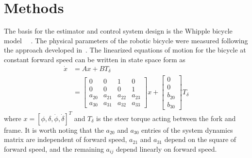 \documentclass[letterpaper,11pt]{article}
\begin{document}
\section{Methods} \label{sec:methods}
The basis for the estimator and control system design is the Whipple bicycle
model~\cite{Whipple1899}~\cite{Meijaard2007} . The physical parameters of the robotic bicycle were
measured following the approach developed in~\cite{Moore2010b}.  The linearized
equations of motion for the bicycle at constant forward speed can be written in state space form as
\begin{align}
  \dot{x} &= A x + B T_\delta \\
          &= \left[\begin{smallmatrix}0 & 0 & 1 & 0\\0 & 0 & 0 & 1\\a_{20} & a_{21} &
a_{22} & a_{23}\\a_{30} & a_{31} & a_{32} & a_{33}\end{smallmatrix}\right] x +
\left[\begin{smallmatrix}0\\0\\b_{20}\\b_{30}\end{smallmatrix}\right] T_\delta
\label{eq:linsys}
\end{align}
where $x = \left[\phi, \delta, \dot{\phi}, \dot{\delta}\right]^T$ and
$T_\delta$ is the steer torque acting between the fork and frame. It is
worth noting that the $a_{20}$ and $a_{30}$ entries of the system dynamics
matrix are independent of forward speed, $a_{21}$ and $a_{31}$ depend on the
square of forward speed, and the remaining $a_{ij}$ depend linearly on forward
speed.
\end{document}
